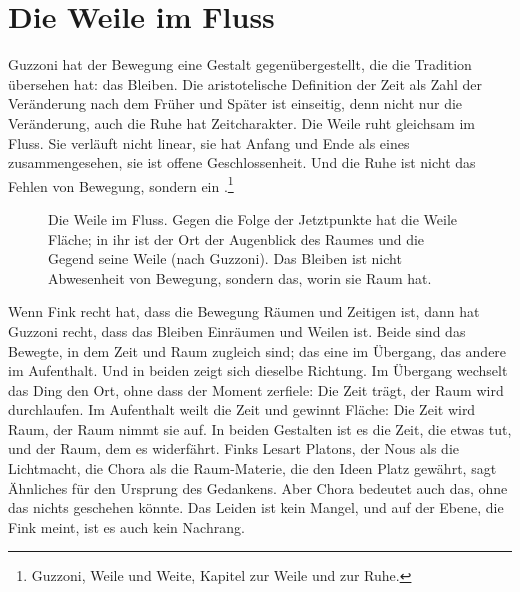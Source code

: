 \section{Die Weile im Fluss}

Guzzoni hat der Bewegung eine Gestalt gegenübergestellt, die die Tradition übersehen hat: das Bleiben. Die aristotelische Definition der Zeit als Zahl der Veränderung nach dem Früher und Später ist einseitig, denn nicht nur die Veränderung, auch die Ruhe hat Zeitcharakter. Die Weile ruht gleichsam im Fluss. Sie verläuft nicht linear, sie hat Anfang und Ende als eines zusammengesehen, sie ist offene Geschlossenheit. Und die Ruhe ist nicht das Fehlen von Bewegung, sondern ein .\footnote{Guzzoni, Weile und Weite, Kapitel zur Weile und zur Ruhe.}

\begin{figure}[htbp]
\centering
{}
\caption{Die Weile im Fluss. Gegen die Folge der Jetztpunkte hat die Weile Fläche; in ihr ist der Ort der Augenblick des Raumes und die Gegend seine Weile (nach Guzzoni). Das Bleiben ist nicht Abwesenheit von Bewegung, sondern das, worin sie Raum hat.}
\label{abb:weile}
\end{figure}

Wenn Fink recht hat, dass die Bewegung Räumen und Zeitigen ist, dann hat Guzzoni recht, dass das Bleiben Einräumen und Weilen ist. Beide sind das Bewegte, in dem Zeit und Raum zugleich sind; das eine im Übergang, das andere im Aufenthalt. Und in beiden zeigt sich dieselbe Richtung. Im Übergang wechselt das Ding den Ort, ohne dass der Moment zerfiele: Die Zeit trägt, der Raum wird durchlaufen. Im Aufenthalt weilt die Zeit und gewinnt Fläche: Die Zeit wird Raum, der Raum nimmt sie auf. In beiden Gestalten ist es die Zeit, die etwas tut, und der Raum, dem es widerfährt. Finks Lesart Platons, der Nous als die Lichtmacht, die Chora als die Raum-Materie, die den Ideen Platz gewährt, sagt Ähnliches für den Ursprung des Gedankens. Aber Chora bedeutet auch das, ohne das nichts geschehen könnte. Das Leiden ist kein Mangel, und auf der Ebene, die Fink meint, ist es auch kein Nachrang.
